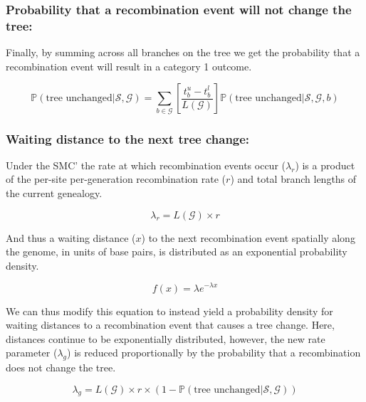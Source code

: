 \documentclass[11pt]{article}
\begin{document}
\subsubsection{Probability that a recombination event will not change the tree:}
Finally, by summing across all branches on the tree 
we get the
probability that a recombination event will result in a category 1 outcome.

\begin{equation}
	\mathbb{P}(\textrm{tree unchanged} | \mathcal{S},\mathcal{G}) = 
	\sum_{b \in \mathcal{G}}
	\left[\frac{t^u_b - t^l_b}{L(\mathcal{G})}\right]
	\mathbb{P}(\textrm{tree unchanged} | \mathcal{S},\mathcal{G},b)
\end{equation}

\subsubsection{Waiting distance to the next tree change:}
Under the SMC' the rate at which recombination events occur ($\lambda_r$)
is a product of the per-site per-generation recombination rate ($r$) and 
total branch lengths of the current genealogy.

\begin{equation}
	\lambda_{r} = L(\mathcal{G}) \times r
\end{equation}

\noindent And thus a waiting distance ($x$) to the next recombination event 
spatially along the genome, in units of base pairs,
is distributed as an exponential probability density.

\begin{equation}
	f(x) = \lambda e^{-\lambda x}
\end{equation}

\noindent We can thus modify this equation to instead yield a probability
density for waiting distances to a recombination event that causes a 
tree change. 
Here, distances continue to be exponentially distributed, however, 
the new rate parameter ($\lambda_g$) is reduced proportionally by 
the probability that a recombination does not change the tree.

\begin{equation}
	\lambda_{g} = 
	L(\mathcal{G}) \times r \times 
	(1 - \mathbb{P}(\text{tree unchanged} | \mathcal{S},\mathcal{G}))
\end{equation}

\end{document}
